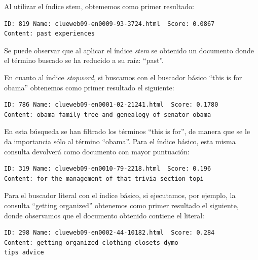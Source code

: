 \documentclass[spanish]{assignment}
\begin{document}
	Al utilizar el índice stem, obtememos como primer resultado:
	\begin{lstlisting}
ID: 819	Name: clueweb09-en0009-93-3724.html  Score: 0.0867
Content: past experiences
	\end{lstlisting}      
	
	Se puede observar que al aplicar el índice \textit{stem} se obtenido un documento donde el término buscado se ha reducido a su raíz: ``past''.
	
	En cuanto al índice \textit{stopword}, si buscamos con el buscador básico ``this is for obama'' obtenemos como primer resultado el siguiente:
\begin{lstlisting}
ID: 786	Name: clueweb09-en0001-02-21241.html  Score: 0.1780
Content: obama family tree and genealogy of senator obama
\end{lstlisting} 
	En esta búsqueda se han filtrado los términos ``this is for'', de manera que se le da importancia sólo al término ``obama''. Para el índice básico, esta misma consulta devolverá como documento con mayor puntuación:
	
\begin{lstlisting}
ID: 319	Name: clueweb09-en0010-79-2218.html  Score: 0.196
Content: for the management of that trivia section topi
\end{lstlisting}

	Para el buscador literal con el índice básico, si ejecutamos, por ejemplo, la consulta ``getting organized''
	obtenemos como primer resultado el siguiente, donde observamos que el documento obtenido contiene el literal:

\begin{lstlisting}
ID: 298	Name: clueweb09-en0002-44-10182.html  Score: 0.284
Content: getting organized clothing closets dymo 
tips advice
\end{lstlisting}	

	
\end{document}
